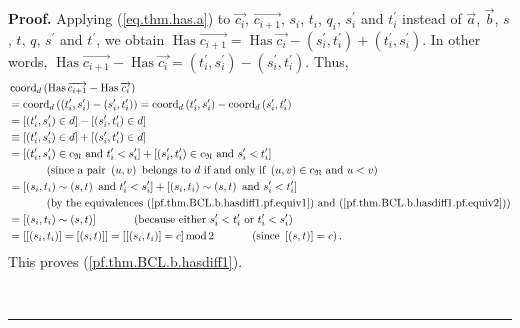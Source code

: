 \documentclass[numbers=enddot,12pt,final,onecolumn,notitlepage,abstracton]{scrartcl}%
\theoremstyle{definition}
\newenvironment{proof}[1][Proof]{\noindent\textbf{#1.} }{\ \rule{0.5em}{0.5em}}
\begin{document}
\begin{proof}
Applying (\ref{eq.thm.has.a}) to $\overrightarrow{c_{i}}$,
$\overrightarrow{c_{i+1}}$, $s_{i}$, $t_{i}$, $q_{i}$, $s_{i}^{\prime}$ and
$t_{i}^{\prime}$ instead of $\overrightarrow{a}$, $\overrightarrow{b}$, $s$,
$t$, $q$, $s^{\prime}$ and $t^{\prime}$, we obtain $\operatorname*{Has}%
\overrightarrow{c_{i+1}}=\operatorname*{Has}\overrightarrow{c_{i}}-\left(
s_{i}^{\prime},t_{i}^{\prime}\right)  +\left(  t_{i}^{\prime},s_{i}^{\prime
}\right)  $. In other words, $\operatorname*{Has}\overrightarrow{c_{i+1}%
}-\operatorname*{Has}\overrightarrow{c_{i}}=\left(  t_{i}^{\prime}%
,s_{i}^{\prime}\right)  -\left(  s_{i}^{\prime},t_{i}^{\prime}\right)  $.
Thus,%
\begin{align*}
&  \operatorname*{coord}\nolimits_{d}\left(  \operatorname*{Has}%
\overrightarrow{c_{i+1}}-\operatorname*{Has}\overrightarrow{c_{i}}\right) \\
&  =\operatorname*{coord}\nolimits_{d}\left(  \left(  t_{i}^{\prime}%
,s_{i}^{\prime}\right)  -\left(  s_{i}^{\prime},t_{i}^{\prime}\right)
\right)  =\operatorname*{coord}\nolimits_{d}\left(  t_{i}^{\prime}%
,s_{i}^{\prime}\right)  -\operatorname*{coord}\nolimits_{d}\left(
s_{i}^{\prime},t_{i}^{\prime}\right) \\
&  =\left[  \left(  t_{i}^{\prime},s_{i}^{\prime}\right)  \in d\right]
-\left[  \left(  s_{i}^{\prime},t_{i}^{\prime}\right)  \in d\right] \\
&  \equiv\left[  \left(  t_{i}^{\prime},s_{i}^{\prime}\right)  \in d\right]
+\left[  \left(  s_{i}^{\prime},t_{i}^{\prime}\right)  \in d\right] \\
&  =\left[  \left(  t_{i}^{\prime},s_{i}^{\prime}\right)  \in c_{\mathfrak{N}%
}\text{ and }t_{i}^{\prime}<s_{i}^{\prime}\right]  +\left[  \left(
s_{i}^{\prime},t_{i}^{\prime}\right)  \in c_{\mathfrak{N}}\text{ and }%
s_{i}^{\prime}<t_{i}^{\prime}\right] \\
&  \ \ \ \ \ \ \ \ \ \ \left(  \text{since a pair }\left(  u,v\right)  \text{
belongs to }d\text{ if and only if }\left(  u,v\right)  \in c_{\mathfrak{N}%
}\text{ and }u<v\right) \\
&  =\left[  \left(  s_{i},t_{i}\right)  \sim\left(  s,t\right)  \text{ and
}t_{i}^{\prime}<s_{i}^{\prime}\right]  +\left[  \left(  s_{i},t_{i}\right)
\sim\left(  s,t\right)  \text{ and }s_{i}^{\prime}<t_{i}^{\prime}\right] \\
&  \ \ \ \ \ \ \ \ \ \ \left(  \text{by the equivalences
(\ref{pf.thm.BCL.b.hasdiff1.pf.equiv1}) and
(\ref{pf.thm.BCL.b.hasdiff1.pf.equiv2})}\right) \\
&  =\left[  \left(  s_{i},t_{i}\right)  \sim\left(  s,t\right)  \right]
\ \ \ \ \ \ \ \ \ \ \left(  \text{because either }s_{i}^{\prime}<t_{i}%
^{\prime}\text{ or }t_{i}^{\prime}<s_{i}^{\prime}\right) \\
&  =\left[  \left[  \left(  s_{i},t_{i}\right)  \right]  =\left[  \left(
s,t\right)  \right]  \right]  =\left[  \left[  \left(  s_{i},t_{i}\right)
\right]  =c\right]  \operatorname{mod}2\ \ \ \ \ \ \ \ \ \ \left(  \text{since
}\left[  \left(  s,t\right)  \right]  =c\right)  .
\end{align*}
This proves (\ref{pf.thm.BCL.b.hasdiff1}).


\end{proof}
\end{document}
